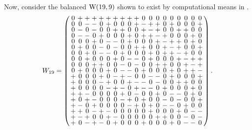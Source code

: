 \documentclass[../../../main]{subfiles}
\begin{document}
 Now, consider the balanced $\text{W}(19,9)$ shown to exist by computational means in \cite{bgw-19-9-4}.
 \[
  W_{19}=
  \arraycolsep=1.25pt\def\arraystretch{0.625}
  \left(\begin{array}{ccccccccccccccccccc}
          0&+&+&+&+&+&+&+&+&+&0&0&0&0&0&0&0&0&0\\
          0&0&-&-&0&+&0&0&0&+&-&+&+&0&+&0&0&0&+\\
          0&-&0&-&0&0&+&+&0&0&+&-&+&0&0&+&+&0&0\\
          0&-&-&0&+&0&0&0&+&0&+&+&-&+&0&0&0&+&0\\
          0&0&0&+&0&-&-&0&+&0&0&0&+&-&+&+&0&+&0\\
          0&+&0&0&-&0&-&0&0&+&+&0&0&+&-&+&0&0&+\\
          0&0&+&0&-&-&0&+&0&0&0&+&0&+&+&-&+&0&0\\
          0&0&+&0&0&0&+&0&-&-&0&+&0&0&0&+&-&+&+\\
          0&0&0&+&+&0&0&-&0&-&0&0&+&+&0&0&+&-&+\\
          0&+&0&0&0&+&0&-&-&0&+&0&0&0&+&0&+&+&-\\
          +&0&0&0&+&0&-&+&-&0&0&-&-&0&+&0&0&0&+\\
          +&0&0&0&-&+&0&0&+&-&-&0&-&0&0&+&+&0&0\\
          +&0&0&0&0&-&+&-&0&+&-&-&0&+&0&0&0&+&0\\
          +&+&-&0&0&0&0&+&0&-&0&0&+&0&-&-&0&+&0\\
          +&0&+&-&0&0&0&-&+&0&+&0&0&-&0&-&0&0&+\\
          +&-&0&+&0&0&0&0&-&+&0&+&0&-&-&0&+&0&0\\
          +&+&0&-&+&-&0&0&0&0&0&+&0&0&0&+&0&-&-\\
          +&-&+&0&0&+&-&0&0&0&0&0&+&+&0&0&-&0&-\\
          +&0&-&+&-&0&+&0&0&0&+&0&0&0&+&0&-&-&0\\
  \end{array}\right).
 \]
 
\end{document}
